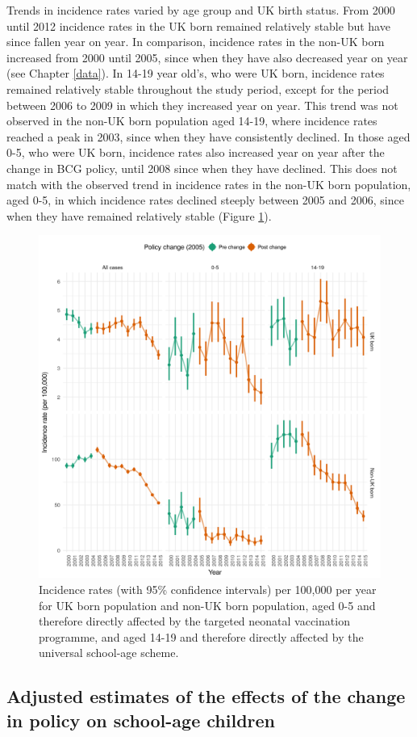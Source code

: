 \documentclass[11pt,twoside]{bristolthesis}
\begin{document}
  Trends in incidence rates varied by age group and UK birth status. From 2000 until 2012 incidence rates in the UK born remained relatively stable but have since fallen year on year. In comparison, incidence rates in the non-UK born increased from 2000 until 2005, since when they have also decreased year on year (see Chapter \ref{data}). In 14-19 year old's, who were UK born, incidence rates remained relatively stable throughout the study period, except for the period between 2006 to 2009 in which they increased year on year. This trend was not observed in the non-UK born population aged 14-19, where incidence rates reached a peak in 2003, since when they have consistently declined. In those aged 0-5, who were UK born, incidence rates also increased year on year after the change in BCG policy, until 2008 since when they have declined. This does not match with the observed trend in incidence rates in the non-UK born population, aged 0-5, in which incidence rates declined steeply between 2005 and 2006, since when they have remained relatively stable (Figure \ref{fig:07-inc-rate-summary-plot}).
  \begin{figure}
  
  {\centering \includegraphics[width=0.8\linewidth]{chapters/direct-eff-bcg-change/figure-2} 
  
  }
  
  \caption{Incidence rates (with 95\% confidence intervals) per 100,000 per year for UK born population and non-UK born population, aged 0-5 and therefore directly affected by the targeted neonatal vaccination programme, and aged 14-19 and therefore directly affected by the universal school-age scheme.}\label{fig:07-inc-rate-summary-plot}
  \end{figure}
  \hypertarget{adjusted-estimates-of-the-effects-of-the-change-in-policy-on-school-age-children}{%
  \subsection{Adjusted estimates of the effects of the change in policy on school-age children}\label{adjusted-estimates-of-the-effects-of-the-change-in-policy-on-school-age-children}}
  
\end{document}
